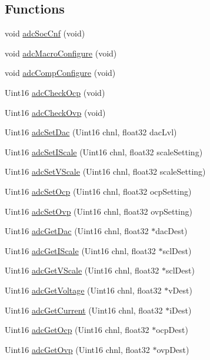 \subsection*{Functions}
\begin{DoxyCompactItemize}
\item 
void \hyperlink{a00005_af77988a3ac7a924b75e6213631b04d46}{adc\-Soc\-Cnf} (void)
\item 
void \hyperlink{a00005_a3c614312b1f0ce65b46c4d93051de836}{adc\-Macro\-Configure} (void)
\item 
void \hyperlink{a00005_a646e6cc4558594a6fbaa10c767cc4fec}{adc\-Comp\-Configure} (void)
\item 
Uint16 \hyperlink{a00005_a7dfbe5e2625efeeb0768d42d83a71c04}{adc\-Check\-Ocp} (void)
\item 
Uint16 \hyperlink{a00005_a0ad871be22e7987be07a0f4534ef231b}{adc\-Check\-Ovp} (void)
\item 
Uint16 \hyperlink{a00005_aca1e33ca1b293964f5ce58d430e684f0}{adc\-Set\-Dac} (Uint16 chnl, float32 dac\-Lvl)
\item 
Uint16 \hyperlink{a00005_a2dcc5ee51599a4026fc672072a3f8232}{adc\-Set\-I\-Scale} (Uint16 chnl, float32 scale\-Setting)
\item 
Uint16 \hyperlink{a00005_a9c87603c2aabc17d784a9149563e71e5}{adc\-Set\-V\-Scale} (Uint16 chnl, float32 scale\-Setting)
\item 
Uint16 \hyperlink{a00005_ac5c13a2ef6c3a9f9da7bf437e0213da2}{adc\-Set\-Ocp} (Uint16 chnl, float32 ocp\-Setting)
\item 
Uint16 \hyperlink{a00005_a03e263230a1a25337050bfde1172d1a1}{adc\-Set\-Ovp} (Uint16 chnl, float32 ovp\-Setting)
\item 
Uint16 \hyperlink{a00005_a51b43d0fbadcb3b231f4fceb4c7b9d12}{adc\-Get\-Dac} (Uint16 chnl, float32 $\ast$dac\-Dest)
\item 
Uint16 \hyperlink{a00005_acbf7c83ae3b6df7b0812ef1aed2b9c96}{adc\-Get\-I\-Scale} (Uint16 chnl, float32 $\ast$scl\-Dest)
\item 
Uint16 \hyperlink{a00005_a478f6261679944822575231af3eb229c}{adc\-Get\-V\-Scale} (Uint16 chnl, float32 $\ast$scl\-Dest)
\item 
Uint16 \hyperlink{a00005_a47082a746494c4221df1cb453fa746f7}{adc\-Get\-Voltage} (Uint16 chnl, float32 $\ast$v\-Dest)
\item 
Uint16 \hyperlink{a00005_a2cda2df7670a029f25848b9fe6f37bf8}{adc\-Get\-Current} (Uint16 chnl, float32 $\ast$i\-Dest)
\item 
Uint16 \hyperlink{a00005_a8e08c745a25782602c5d337d5eb7b03c}{adc\-Get\-Ocp} (Uint16 chnl, float32 $\ast$ocp\-Dest)
\item 
Uint16 \hyperlink{a00005_a1536739f53a776036e1b9c92990a102a}{adc\-Get\-Ovp} (Uint16 chnl, float32 $\ast$ovp\-Dest)
\end{DoxyCompactItemize}
